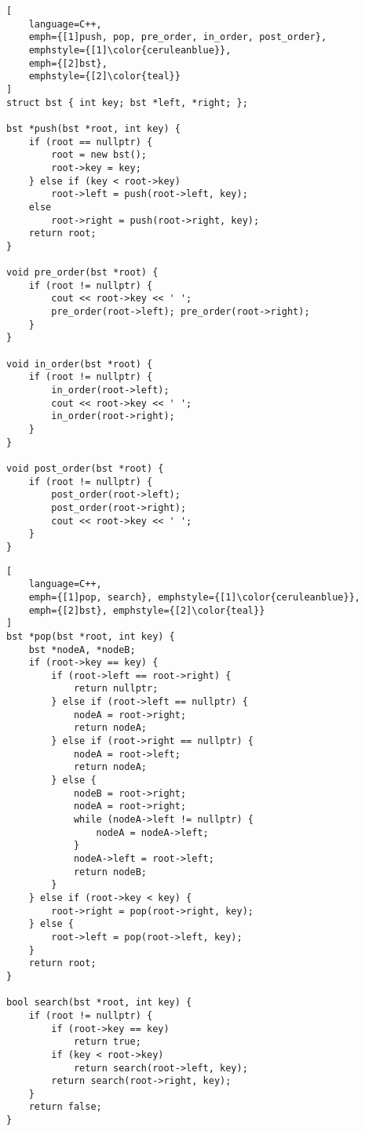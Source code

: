 \begin{lstlisting}[
    language=C++,
    emph={[1]push, pop, pre_order, in_order, post_order},
    emphstyle={[1]\color{ceruleanblue}},
    emph={[2]bst},
    emphstyle={[2]\color{teal}}
]
struct bst { int key; bst *left, *right; };

bst *push(bst *root, int key) {
    if (root == nullptr) { 
        root = new bst();
        root->key = key;
    } else if (key < root->key)
        root->left = push(root->left, key);
    else
        root->right = push(root->right, key);
    return root;
}

void pre_order(bst *root) {
    if (root != nullptr) {
        cout << root->key << ' ';
        pre_order(root->left); pre_order(root->right);
    }
}

void in_order(bst *root) {
    if (root != nullptr) {
        in_order(root->left);
        cout << root->key << ' ';
        in_order(root->right);
    }
}

void post_order(bst *root) {
    if (root != nullptr) {
        post_order(root->left);
        post_order(root->right);
        cout << root->key << ' ';
    }
}
\end{lstlisting}

\newpage

\begin{lstlisting}[
    language=C++,
    emph={[1]pop, search}, emphstyle={[1]\color{ceruleanblue}},
    emph={[2]bst}, emphstyle={[2]\color{teal}}
]
bst *pop(bst *root, int key) {
    bst *nodeA, *nodeB;
    if (root->key == key) {
        if (root->left == root->right) {
            return nullptr;
        } else if (root->left == nullptr) {
            nodeA = root->right;
            return nodeA;
        } else if (root->right == nullptr) {
            nodeA = root->left;
            return nodeA;
        } else {
            nodeB = root->right;
            nodeA = root->right;
            while (nodeA->left != nullptr) {
                nodeA = nodeA->left;
            }
            nodeA->left = root->left;
            return nodeB;
        }
    } else if (root->key < key) {
        root->right = pop(root->right, key);
    } else {
        root->left = pop(root->left, key);
    }
    return root;
}

bool search(bst *root, int key) {
    if (root != nullptr) {
        if (root->key == key)
            return true;
        if (key < root->key)
            return search(root->left, key);
        return search(root->right, key);
    }
    return false;
}
\end{lstlisting}